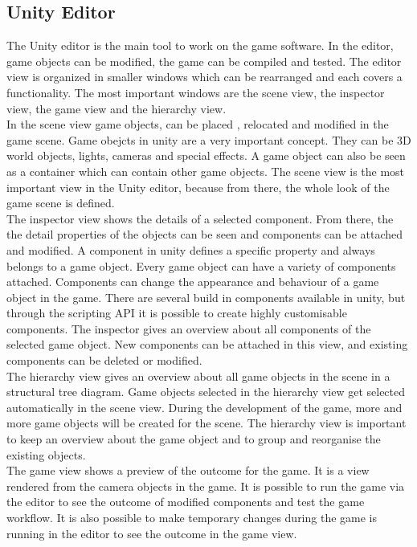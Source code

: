 \subsection{Unity Editor}
The Unity editor is the main tool to work on the game software. In the editor, game objects can be modified, the game can be compiled and tested. The editor view is organized in smaller windows which can be rearranged and each covers a functionality. The most important windows are the scene view, the inspector view, the game view and the hierarchy view.\\
In the scene view game objects, can be placed , relocated and modified in the game scene. Game obejcts in unity are a very important concept. They can be 3D world objects, lights, cameras and special effects. A game object can also be seen as a container which can contain other game objects. The scene view is the most important view in the Unity editor, because from there, the whole look of the game scene is defined.\\
The inspector view shows the details of a selected component. From there, the the detail properties of the objects can be seen and components can be attached and modified. A component in unity defines a specific property and always belongs to a game object. Every game object can have a variety of components attached. Components can change the appearance and behaviour of a game object in the game. There are several build in components available in unity, but through the scripting API it is possible to create highly customisable components. The inspector gives an overview about all components of the selected game object. New components can be attached in this view, and existing components can be deleted or modified.\\
The hierarchy view gives an overview about all game objects in the scene in a structural tree diagram. Game objects selected in the hierarchy view get selected automatically in the scene view. During the development of the game, more and more game objects will be created for the scene. The hierarchy view is important to keep an overview about the game object and to group and reorganise the existing objects.\\
The game view shows a preview of the outcome for the game. It is a view rendered from the camera objects in the game. It is possible to run the game via the editor to see the outcome of modified components and test the game workflow. It is also possible to make temporary changes during the game is running in the editor to see the outcome in the game view.
